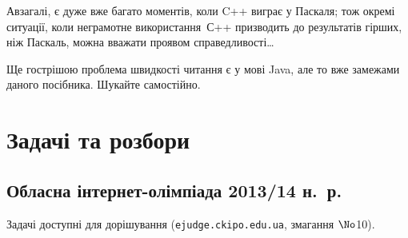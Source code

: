 \documentclass[14pt,a4paper]{extarticle}
\begin{document}
А\nolinebreak[3] взагалі, є дуже вже багато моментів, коли C++ виграє у Паскаля; тож окремі ситуації, коли неграмотне використання~С++ призводить до результатів гірших, ніж Паскаль, можна вважати проявом справедливості\dots

Ще гострішою проблема швидкості читання є у мові Java, але то вже за\nolinebreak[3] межами даного посібника. Шукайте самостійно.\label{text:FAQ-end}




\section{Задачі та розбори}
\vspace{-0.5\baselineskip}


\subsection{Обласна інтернет-олімпіада 2013/14 н.~р.}
\renewenvironment{problemAllDefault}[1]{\vspace{10mm}\par\begin{problem}{#1}{Клавіатура (stdin)}{Екран (stdout)}{1 сек}{64 мегабайти}}{\end{problem}}

Задачі доступні для дорішування (\verb"ejudge.ckipo.edu.ua", змагання $\No$10).
\end{document}
